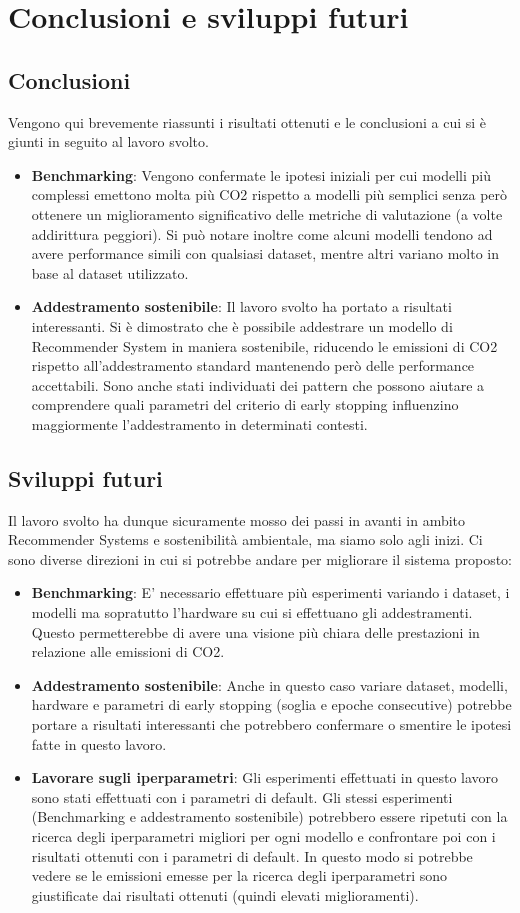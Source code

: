 \section{Conclusioni e sviluppi futuri}
\subsection{Conclusioni}
Vengono qui brevemente riassunti i risultati ottenuti e le conclusioni a cui si è giunti in seguito al lavoro svolto.
\begin{itemize}
    \item \textbf{Benchmarking}: Vengono confermate le ipotesi iniziali per cui modelli più complessi emettono molta più CO2 rispetto a modelli più semplici senza però ottenere un miglioramento significativo delle metriche di valutazione (a volte addirittura peggiori). Si può notare inoltre come alcuni modelli tendono ad avere performance simili con qualsiasi dataset, mentre altri variano molto in base al dataset utilizzato.
    \item \textbf{Addestramento sostenibile}: Il lavoro svolto ha portato a risultati interessanti. Si è dimostrato che è possibile addestrare un modello di Recommender System in maniera sostenibile, riducendo le emissioni di CO2 rispetto all'addestramento standard mantenendo però delle performance accettabili. Sono anche stati individuati dei pattern che possono aiutare a comprendere quali parametri del criterio di early stopping influenzino maggiormente l'addestramento in determinati contesti.
\end{itemize}
\subsection{Sviluppi futuri}
Il lavoro svolto ha dunque sicuramente mosso dei passi in avanti in ambito Recommender Systems e sostenibilità ambientale, ma siamo solo agli inizi. Ci sono diverse direzioni in cui si potrebbe andare per migliorare il sistema proposto:
\begin{itemize}
    \item \textbf{Benchmarking}: E' necessario effettuare più esperimenti variando i dataset, i modelli ma sopratutto l'hardware su cui si effettuano gli addestramenti. Questo permetterebbe di avere una visione più chiara delle prestazioni in relazione alle emissioni di CO2.
    \item \textbf{Addestramento sostenibile}: Anche in questo caso variare dataset, modelli, hardware e parametri di early stopping (soglia e epoche consecutive) potrebbe portare a risultati interessanti che potrebbero confermare o smentire le ipotesi fatte in questo lavoro.
    \item \textbf{Lavorare sugli iperparametri}: Gli esperimenti effettuati in questo lavoro sono stati effettuati con i parametri di default. Gli stessi esperimenti (Benchmarking e addestramento sostenibile) potrebbero essere ripetuti con la ricerca degli iperparametri migliori per ogni modello e confrontare poi con i risultati ottenuti con i parametri di default. In questo modo si potrebbe vedere se le emissioni emesse per la ricerca degli iperparametri sono giustificate dai risultati ottenuti (quindi elevati miglioramenti).
\end{itemize}